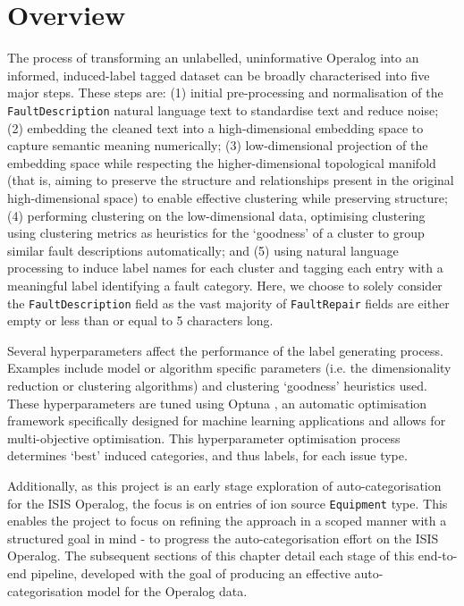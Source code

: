 \documentclass[10pt,oneside]{report}
\begin{document}
\section{Overview}


The process of transforming an unlabelled, uninformative Operalog into an informed, induced-label tagged dataset can be broadly characterised into five major steps. These steps are: (1) initial pre-processing and normalisation of the \texttt{FaultDescription} natural language text to standardise text and reduce noise; (2) embedding the cleaned text into a high-dimensional embedding space to capture semantic meaning numerically; (3) low-dimensional projection of the embedding space while respecting the higher-dimensional topological manifold (that is, aiming to preserve the structure and relationships present in the original high-dimensional space) to enable effective clustering while preserving structure; (4) performing clustering on the low-dimensional data, optimising clustering using clustering metrics as heuristics for the `goodness' of a cluster to group similar fault descriptions automatically; and (5) using natural language processing to induce label names for each cluster and tagging each entry with a meaningful label identifying a fault category.  Here, we choose to solely consider the \texttt{FaultDescription} field as the vast majority of \texttt{FaultRepair} fields are either empty or less than or equal to 5 characters long. 

Several hyperparameters affect the performance of the label generating process. Examples include model or algorithm specific parameters (i.e. the dimensionality reduction or clustering algorithms) and clustering `goodness' heuristics used. These hyperparameters are tuned using Optuna \cite{akiba2019optuna}, an automatic optimisation framework specifically designed for machine learning applications and allows for multi-objective optimisation. This hyperparameter optimisation process determines `best' induced categories, and thus labels, for each issue type. 

Additionally, as this project is an early stage exploration of auto-categorisation for the ISIS Operalog, the focus is on entries of ion source \texttt{Equipment} type. This enables the project to focus on refining the approach in a scoped manner with a structured goal in mind - to progress the auto-categorisation effort on the ISIS Operalog. The subsequent sections of this chapter detail each stage of this end-to-end pipeline, developed with the goal of producing an effective auto-categorisation model for the Operalog data.
\end{document}

